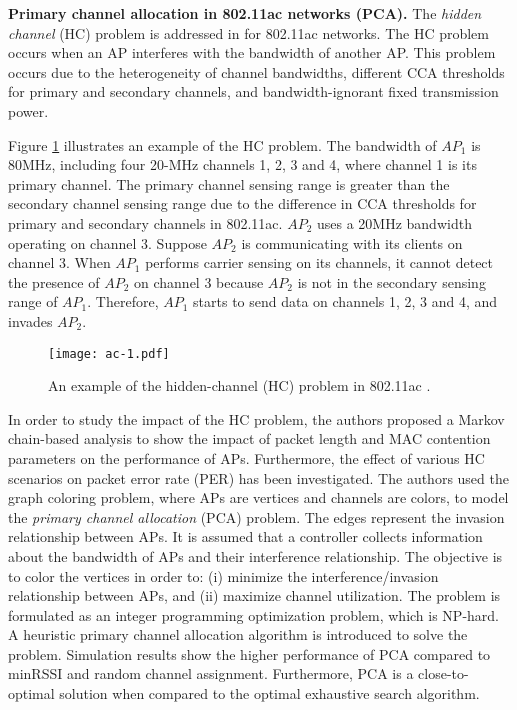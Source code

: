 \textbf{Primary channel allocation in 802.11ac networks (PCA).}
\label{PCA}
The \textit{hidden channel} (HC) problem is addressed in \cite{802.11ac-PCA} for 802.11ac networks. 
The HC problem occurs when an AP interferes with the bandwidth of another AP.
This problem occurs due to the heterogeneity of channel bandwidths, different CCA thresholds for primary and secondary channels, and bandwidth-ignorant fixed transmission power. 

Figure \ref{invading} illustrates an example of the HC problem. 
The bandwidth of $AP_{1}$ is 80MHz, including four 20-MHz channels 1, 2, 3 and 4, where channel 1 is its primary channel. 
The primary channel sensing range is greater than the secondary channel sensing range due to the difference in CCA thresholds for primary and secondary channels in 802.11ac. 
$AP_{2}$ uses a 20MHz bandwidth operating on channel 3. 
Suppose $AP_{2}$ is communicating with its clients on channel 3. 
When $AP_{1}$ performs carrier sensing on its channels, it cannot detect the presence of $AP_{2}$ on channel 3 because $AP_{2}$ is not in the secondary sensing range of $AP_{1}$. 
Therefore, $AP_{1}$ starts to send data on channels 1, 2, 3 and 4, and invades $AP_{2}$. 
%
\begin{figure}[!t]
	\centering
	\texttt{[image: ac-1.pdf]}
	\caption{An example of the hidden-channel (HC) problem in 802.11ac \cite{802.11ac-PCA}.}
	\label{invading}
\end{figure}
%
%

In order to study the impact of the HC problem, the authors proposed a Markov chain-based analysis to show the impact of packet length and MAC contention parameters on the performance of APs. 
Furthermore, the effect of various HC scenarios on packet error rate (PER) has been investigated. 
The authors used the graph coloring problem, where APs are vertices and channels are colors, to model the \textit{primary channel allocation} (PCA) problem. 
The edges represent the invasion relationship between APs. 
It is assumed that a controller collects information about the bandwidth of APs and their interference relationship.
The objective is to color the vertices in order to: (i) minimize the interference/invasion relationship between APs, and (ii) maximize channel utilization. 
The problem is formulated as an integer programming optimization problem, which is NP-hard.
A heuristic primary channel allocation algorithm is introduced to solve the problem.
Simulation results show the higher performance of PCA compared to minRSSI and random channel assignment.
Furthermore, PCA is a close-to-optimal solution when compared to the optimal exhaustive search algorithm.


